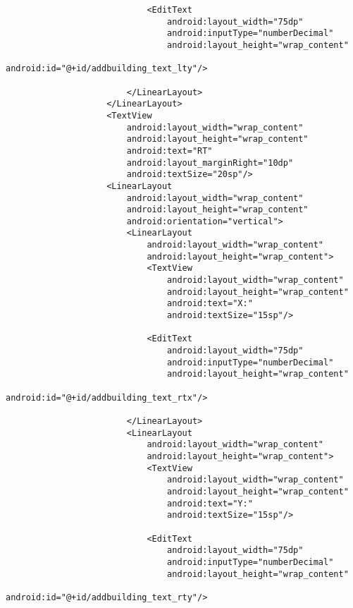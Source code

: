 \begin{lstlisting}
                            <EditText
                                android:layout_width="75dp"
                                android:inputType="numberDecimal"
                                android:layout_height="wrap_content"
                                android:id="@+id/addbuilding_text_lty"/>

                        </LinearLayout>
                    </LinearLayout>
                    <TextView
                        android:layout_width="wrap_content"
                        android:layout_height="wrap_content"
                        android:text="RT"
                        android:layout_marginRight="10dp"
                        android:textSize="20sp"/>
                    <LinearLayout
                        android:layout_width="wrap_content"
                        android:layout_height="wrap_content"
                        android:orientation="vertical">
                        <LinearLayout
                            android:layout_width="wrap_content"
                            android:layout_height="wrap_content">
                            <TextView
                                android:layout_width="wrap_content"
                                android:layout_height="wrap_content"
                                android:text="X:"
                                android:textSize="15sp"/>

                            <EditText
                                android:layout_width="75dp"
                                android:inputType="numberDecimal"
                                android:layout_height="wrap_content"
                                android:id="@+id/addbuilding_text_rtx"/>

                        </LinearLayout>
                        <LinearLayout
                            android:layout_width="wrap_content"
                            android:layout_height="wrap_content">
                            <TextView
                                android:layout_width="wrap_content"
                                android:layout_height="wrap_content"
                                android:text="Y:"
                                android:textSize="15sp"/>

                            <EditText
                                android:layout_width="75dp"
                                android:inputType="numberDecimal"
                                android:layout_height="wrap_content"
                                android:id="@+id/addbuilding_text_rty"/>


\end{lstlisting}
